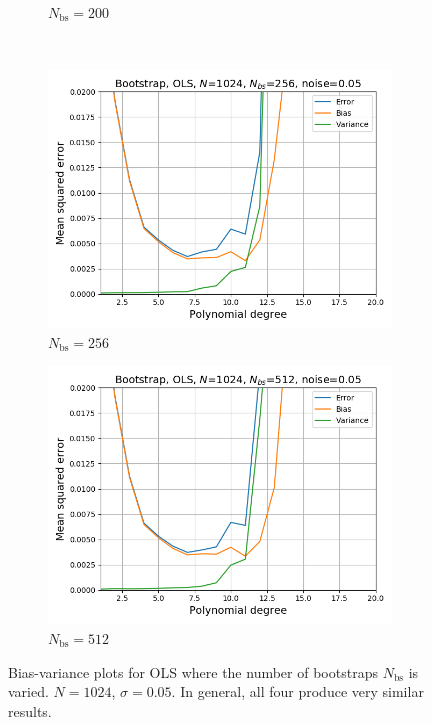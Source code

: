 \documentclass[a4paper]{article}
\begin{document}
\begin{figure}[H]
\begin{subfigure}{0.49\textwidth}
    \caption{$N_{\text{bs}} = 200$}
  \end{subfigure}\\
  \begin{subfigure}{0.49\textwidth}
    \includegraphics[scale=0.45]{../figures/task_b/bias_variance_N1024_pmax20_nlamb1_noise0.05_seed4155_OLS_boot_Nbs256.png}
    \caption{$N_{\text{bs}} = 256$}
  \end{subfigure}
  \begin{subfigure}{0.49\textwidth}
    \includegraphics[scale=0.45]{../figures/task_b/bias_variance_N1024_pmax20_nlamb1_noise0.05_seed4155_OLS_boot_Nbs512.png}
    \caption{$N_{\text{bs}} = 512$}
  \end{subfigure}
  \caption{Bias-variance plots for OLS where the number of bootstraps $N_{\text{bs}}$ is varied. $N=1024$, $\sigma=0.05$. In general, all four produce very similar results.}
  \label{fig:app_Nbs}
\end{figure}
\end{document}
